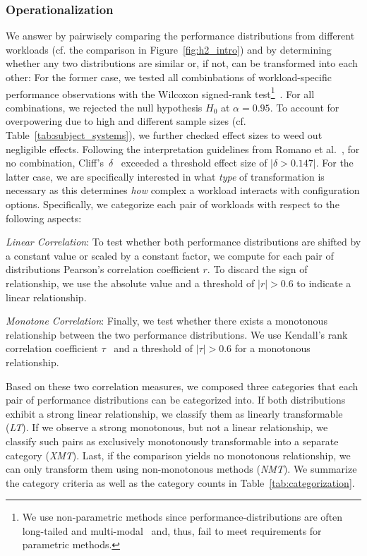 {\subsubsection{Operationalization}
We answer  by pairwisely comparing the performance distributions from different workloads (cf. the comparison in Figure~\ref{fig:h2_intro}) and by determining whether any two distributions are similar or, if not, can be transformed into each other: For the former case, we tested all combinbations of workload-specific performance observations with the Wilcoxon signed-rank test\footnote{We use non-parametric methods since performance-distributions are often long-tailed and multi-modal~\cite{curtsinger_stabilizer_2013,maricq2018taming} and, thus, fail to meet requirements for parametric methods.}~\cite{lovric_international_2010}. For all combinations, we rejected the null hypothesis $H_0$ at $\alpha=0.95$. To account for overpowering due to high and different sample sizes (cf. Table~\ref{tab:subject_systems}), we further checked effect sizes to weed out negligible effects. Following the interpretation guidelines from Romano et al.~\cite{romano2006exploring}, for no combination, Cliff's~$\delta$~\cite{Cliff1993DominanceSO} exceeded a threshold effect size of $\vert\delta > 0.147\vert$.
For the latter case, we are specifically interested in what \textit{type} of transformation is necessary as this determines \textit{how} complex a workload interacts with configuration options. Specifically, we categorize each pair of workloads with respect to the following aspects: 

\begin{compactenum}

	\item \textit{Linear Correlation}: To test whether both performance distributions are shifted by a constant value or scaled by a constant factor, we compute for each pair of distributions Pearson's correlation coefficient $r$. To discard the sign of relationship, we use the absolute value and a threshold of $\vert r\vert >0.6$ to indicate a linear relationship.
	
	\item \textit{Monotone Correlation}: Finally, we test whether there exists a monotonous relationship between the two performance distributions. We use Kendall's rank correlation coefficient $\tau$~\cite{kendall1938new} and a threshold of  $\vert\tau\vert > 0.6$ for a monotonous relationship.
\end{compactenum}
{\color{black}Based on these two correlation measures, we composed three categories that each pair of performance distributions can be categorized into.
If both distributions exhibit a strong linear relationship, we classify them as linearly transformable (\textit{\colorbox{lt-color}{LT}}). If we observe a strong monotonous, but not a linear relationship, we classify such pairs as exclusively monotonously transformable into a separate category (\textit{\colorbox{xmt-color}{XMT}}). Last, if the comparison yields no monotonous relationship, we can only transform them using non-monotonous methods (\textit{\colorbox{nmt-color}{NMT}}). 
We summarize the category criteria as well as the category counts in Table~\ref{tab:categorization}. 

}}
